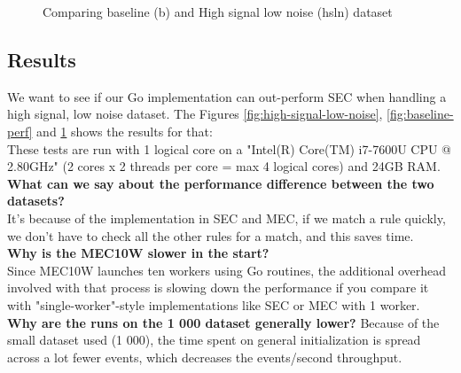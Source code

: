 \begin{figure}[ht]
\centering
{}
\caption{Comparing baseline (b) and High signal low noise (hsln) dataset}
\label{fig:comparing-perf}
\end{figure}

\subsection{Results}
We want to see if our Go implementation can out-perform SEC when handling a high signal, low noise dataset. The Figures \cref{fig:high-signal-low-noise}, \cref{fig:baseline-perf} and \cref{fig:comparing-perf} shows the results for that:
\\
These tests are run with 1 logical core on a "Intel(R) Core(TM) i7-7600U CPU @ 2.80GHz" (2 cores x 2 threads per core = max 4 logical cores) and 24GB RAM.\\
\textbf{What can we say about the performance difference between the two datasets?}\\
It's because of the implementation in SEC and MEC, if we match a rule quickly, we don't have to check all the other rules for a match, and this saves time.\\
\textbf{Why is the MEC10W slower in the start?}\\
Since MEC10W launches ten workers using Go routines, the additional overhead involved with that process is slowing down the performance if you compare it with "single-worker"-style implementations like SEC or MEC with 1 worker.\\
\textbf{Why are the runs on the 1 000 dataset generally lower?}
Because of the small dataset used (1 000), the time spent on general initialization is spread across a lot fewer events, which decreases the events/second throughput.

